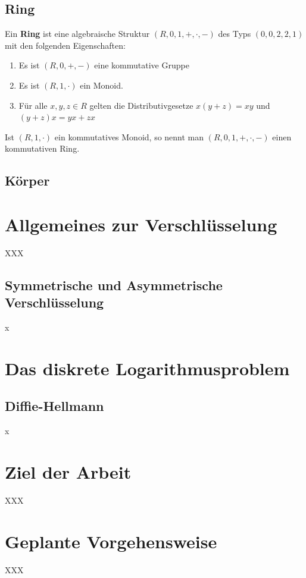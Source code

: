 \subsection{Ring}
Ein \textbf{Ring} ist eine algebraische Struktur $(R,0,1,+,\cdot,-)$ des Typs $(0,0,2,2,1)$ mit den folgenden Eigenschaften:
\begin{enumerate}
\item Es ist $(R,0,+,-)$ eine kommutative Gruppe
\item Es ist $(R,1,\cdot)$ ein Monoid.
\item Für alle $x,y,z \in R$ gelten die Distributivgesetze $x(y+z) = xy$ und $(y+z)x = yx +zx$
\end{enumerate}
Ist $(R,1,\cdot)$ ein kommutatives Monoid, so nennt man $(R,0,1,+,\cdot,-)$ einen kommutativen Ring.

\subsection{Körper}


\section{Allgemeines zur Verschlüsselung}
XXX

\subsection{Symmetrische und Asymmetrische Verschlüsselung}
x

\section{Das diskrete Logarithmusproblem}


\subsection{Diffie-Hellmann}
x


\section{Ziel der Arbeit}
XXX


\section{Geplante Vorgehensweise}
XXX